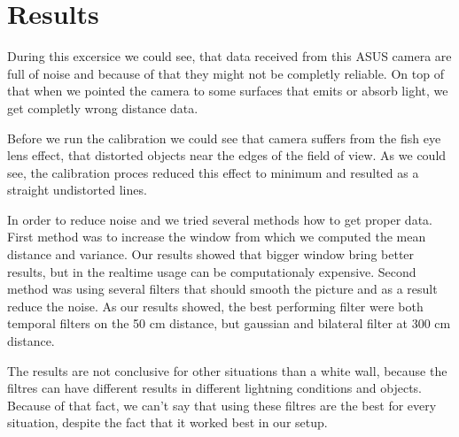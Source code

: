 \documentclass[11pt]{article}
\begin{document}
\section{Results}
During this excersice we could see, that data received from this ASUS camera are 
full of noise and because of that they might not be completly reliable. On top of 
that when we pointed the camera to some surfaces that emits or absorb light, we 
get completly wrong distance data. \par
Before we run the calibration we could see that camera suffers from the fish eye lens 
effect, that distorted objects near the edges of the field of view. As we could see, 
the calibration proces reduced this effect to minimum and resulted as a straight 
undistorted lines. \par
In order to reduce noise and we tried several methods how to get proper data. 
First method was to increase the window from which we computed the mean distance and 
variance. Our results showed that bigger window bring better results, but in the 
realtime usage can be computationaly expensive. Second method was using several filters 
that should smooth the picture and as a result reduce the noise. As our results showed, 
the best performing filter were both temporal filters on the 50 cm distance, but gaussian 
and bilateral filter at 300 cm distance. \par 
The results are not conclusive for other situations than a white wall, because the 
filtres can have different results in different lightning conditions and objects. Because 
of that fact, we can't say that using these filtres are the best for every situation, despite 
the fact that it worked best in our setup. \par


\end{document}
